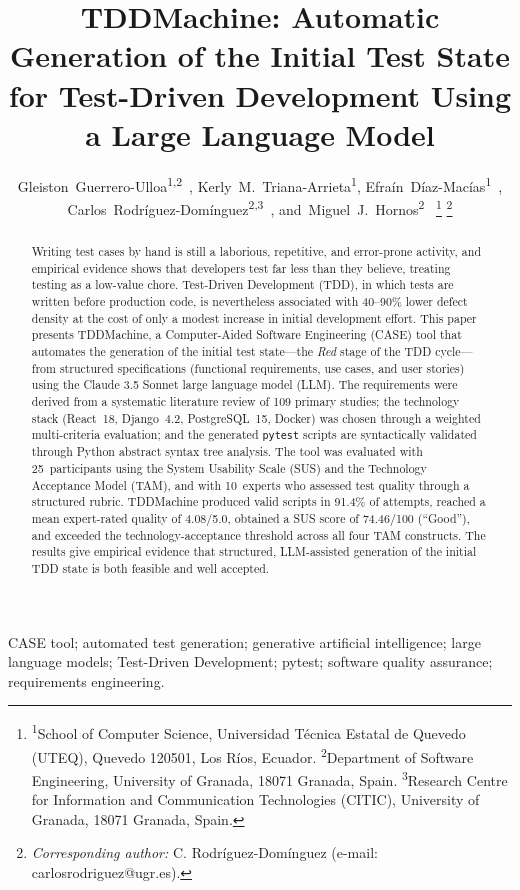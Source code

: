 \documentclass[10pt,journal,twoside,letterpaper]{IEEEtran}
\author{%
    Gleiston~Guerrero-Ulloa\textsuperscript{1,2}~\orcidlink{0000-0001-5990-2357},
    Kerly~M.~Triana-Arrieta\textsuperscript{1},
    Efraín~Díaz-Macías\textsuperscript{1}~\orcidlink{0000-0003-4087-029X},
    Carlos~Rodríguez-Domínguez\textsuperscript{2,3}~\orcidlink{0000-0001-5626-3115},
    and~Miguel~J.~Hornos\textsuperscript{2}~\orcidlink{0000-0001-5722-9816}%
    \thanks{\textsuperscript{1}School of Computer Science, Universidad Técnica Estatal de Quevedo (UTEQ), Quevedo 120501, Los Ríos, Ecuador. \textsuperscript{2}Department of Software Engineering, University of Granada, 18071 Granada, Spain. \textsuperscript{3}Research Centre for Information and Communication Technologies (CITIC), University of Granada, 18071 Granada, Spain.}%
    \thanks{\emph{Corresponding author:} C. Rodríguez-Domínguez (e-mail: carlosrodriguez@ugr.es).}%
}
\begin{document}
    
    \IEEEoverridecommandlockouts
    
    \title{TDDMachine: Automatic Generation of the Initial Test State for Test-Driven Development Using a Large Language Model}
    
    \maketitle
    \thispagestyle{enfoqueutefirstpage}
    
    \begin{abstract}
        Writing test cases by hand is still a laborious, repetitive, and error-prone activity, and empirical evidence shows that developers test far less than they believe, treating testing as a low-value chore. Test-Driven Development (TDD), in which tests are written before production code, is nevertheless associated with 40--90\% lower defect density at the cost of only a modest increase in initial development effort. This paper presents TDDMachine, a Computer-Aided Software Engineering (CASE) tool that automates the generation of the initial test state---the \emph{Red} stage of the TDD cycle---from structured specifications (functional requirements, use cases, and user stories) using the Claude 3.5 Sonnet large language model (LLM). The requirements were derived from a systematic literature review of 109 primary studies; the technology stack (React~18, Django~4.2, PostgreSQL~15, Docker) was chosen through a weighted multi-criteria evaluation; and the generated \texttt{pytest} scripts are syntactically validated through Python abstract syntax tree analysis. The tool was evaluated with 25~participants using the System Usability Scale (SUS) and the Technology Acceptance Model (TAM), and with 10~experts who assessed test quality through a structured rubric. TDDMachine produced valid scripts in 91.4\% of attempts, reached a mean expert-rated quality of 4.08/5.0, obtained a SUS score of 74.46/100 (``Good''), and exceeded the technology-acceptance threshold across all four TAM constructs. The results give empirical evidence that structured, LLM-assisted generation of the initial TDD state is both feasible and well accepted.
    \end{abstract}
    
    \begin{IEEEkeywords}
        CASE tool; automated test generation; generative artificial intelligence; large language models; Test-Driven Development; pytest; software quality assurance; requirements engineering.
    \end{IEEEkeywords}
    
\end{document}
